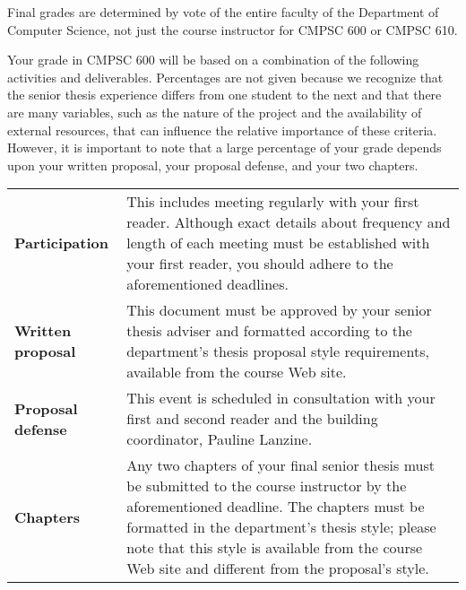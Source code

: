 Final grades are determined by vote of the entire faculty of the Department of Computer Science, not just the course instructor
for CMPSC 600 or CMPSC 610.

Your grade in CMPSC 600 will be based on a combination of the following activities and deliverables. Percentages are not
given because we recognize that the senior thesis experience differs from one student to the next and that there are many
variables, such as the nature of the project and the availability of external resources, that can influence the relative
importance of these criteria. However, it is important to note that a large percentage of your grade depends upon your
written proposal, your proposal defense, and your two chapters.  

% 

\vspace*{-.05in}
\begin{center}
\begin{tabular}{lp{4in}}

\bf Participation & This includes meeting regularly with your first reader. Although exact details about frequency and
length of each meeting must be established with your first reader, you should adhere to the aforementioned deadlines. \\

\bf Written proposal & This document must be approved by your senior thesis adviser and formatted according to the 
department's thesis proposal style requirements, available from the course Web site. \\

\bf Proposal defense & This event is scheduled in consultation with your first and second reader and the building
coordinator, Pauline Lanzine. \\

\bf Chapters & Any two chapters of your final senior thesis must be submitted to the course instructor by the
aforementioned deadline.  The chapters must be formatted in the department's thesis style; please note that
this style is available from the course Web site and different from the proposal's style.

\end{tabular}
\end{center}


